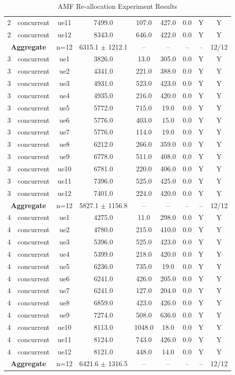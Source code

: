 \begin{table}[ht]
\begin{tabular}{|c|c|c|c|c|c|c|c|c|}
2 & concurrent & ue11 & 7499.0 & 107.0 & 427.0 & 0.0 & Y & Y \\
2 & concurrent & ue12 & 8343.0 & 646.0 & 422.0 & 0.0 & Y & Y \\
\multicolumn{2}{|c|}{\textbf{Aggregate}} & n=12 & 6315.1 $\pm$ 1212.1 & -- & -- & -- & -- & 12/12 \\
\hline
3 & concurrent & ue1 & 3826.0 & 13.0 & 305.0 & 0.0 & Y & Y \\
3 & concurrent & ue2 & 4341.0 & 221.0 & 388.0 & 0.0 & Y & Y \\
3 & concurrent & ue3 & 4931.0 & 523.0 & 423.0 & 0.0 & Y & Y \\
3 & concurrent & ue4 & 4935.0 & 216.0 & 420.0 & 0.0 & Y & Y \\
3 & concurrent & ue5 & 5772.0 & 715.0 & 19.0 & 0.0 & Y & Y \\
3 & concurrent & ue6 & 5776.0 & 403.0 & 15.0 & 0.0 & Y & Y \\
3 & concurrent & ue7 & 5776.0 & 114.0 & 19.0 & 0.0 & Y & Y \\
3 & concurrent & ue8 & 6212.0 & 266.0 & 359.0 & 0.0 & Y & Y \\
3 & concurrent & ue9 & 6778.0 & 511.0 & 408.0 & 0.0 & Y & Y \\
3 & concurrent & ue10 & 6781.0 & 220.0 & 406.0 & 0.0 & Y & Y \\
3 & concurrent & ue11 & 7396.0 & 525.0 & 425.0 & 0.0 & Y & Y \\
3 & concurrent & ue12 & 7401.0 & 224.0 & 420.0 & 0.0 & Y & Y \\
\multicolumn{2}{|c|}{\textbf{Aggregate}} & n=12 & 5827.1 $\pm$ 1156.8 & -- & -- & -- & -- & 12/12 \\
\hline
4 & concurrent & ue1 & 4275.0 & 11.0 & 298.0 & 0.0 & Y & Y \\
4 & concurrent & ue2 & 4780.0 & 215.0 & 410.0 & 0.0 & Y & Y \\
4 & concurrent & ue3 & 5396.0 & 525.0 & 423.0 & 0.0 & Y & Y \\
4 & concurrent & ue4 & 5399.0 & 218.0 & 420.0 & 0.0 & Y & Y \\
4 & concurrent & ue5 & 6236.0 & 735.0 & 19.0 & 0.0 & Y & Y \\
4 & concurrent & ue6 & 6241.0 & 426.0 & 205.0 & 0.0 & Y & Y \\
4 & concurrent & ue7 & 6241.0 & 127.0 & 204.0 & 0.0 & Y & Y \\
4 & concurrent & ue8 & 6859.0 & 423.0 & 426.0 & 0.0 & Y & Y \\
4 & concurrent & ue9 & 7274.0 & 508.0 & 636.0 & 0.0 & Y & Y \\
4 & concurrent & ue10 & 8113.0 & 1048.0 & 18.0 & 0.0 & Y & Y \\
4 & concurrent & ue11 & 8124.0 & 743.0 & 426.0 & 0.0 & Y & Y \\
4 & concurrent & ue12 & 8121.0 & 448.0 & 14.0 & 0.0 & Y & Y \\
\multicolumn{2}{|c|}{\textbf{Aggregate}} & n=12 & 6421.6 $\pm$ 1316.5 & -- & -- & -- & -- & 12/12 \\
\hline
\end{tabular}
\caption{AMF Re-allocation Experiment Results}
\label{tab:amf_realloc}
\end{table}
